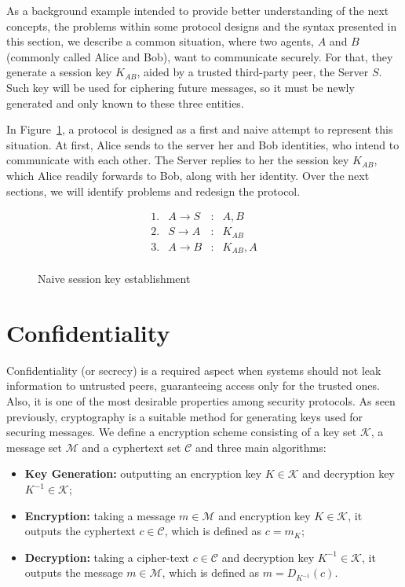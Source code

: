 As a background example intended to provide better understanding of the next concepts, the problems within some protocol designs and the syntax presented in this section, we describe a common situation, where two agents, \(A\) and \(B\) (commonly called Alice and Bob), want to communicate securely. For that, they generate a session key \(K_{AB}\), aided by a trusted third-party peer, the Server \(S\). Such key will be used for ciphering future messages, so it must be newly generated and only known to these three entities.

In Figure~\ref{prt:naive-session-key}, a protocol is designed as a first and naive attempt to represent this situation. At first, Alice sends to the server her and Bob identities, who intend to communicate with each other. The Server replies to her the session key \(K_{AB}\), which Alice readily forwards to Bob, along with her identity. Over the next sections, we will identify problems and redesign the protocol.

\begin{figure}[ht]
  \centering
  \[
    \begin{array}{rlcl}
      1. & A \longrightarrow S & : & A, B \\
      2. & S \longrightarrow A & : & K_{AB} \\
      3. & A \longrightarrow B & : & K_{AB}, A \\
    \end{array}
  \]
  \caption{Naive session key establishment}
  \label{prt:naive-session-key}
\end{figure}





\section{Confidentiality}
Confidentiality (or secrecy) is a required aspect when systems should not leak information to untrusted peers, guaranteeing access only for the trusted ones. Also, it is one of the most desirable properties among security protocols. As seen previously, cryptography is a suitable method for generating keys used for securing messages. We define a encryption scheme consisting of a key set \(\mathcal{K}\), a message set \(\mathcal{M}\) and a cyphertext set \(\mathcal{C}\) and three main algorithms:

\begin{itemize}
  \item \textbf{Key Generation:} outputting an encryption key \(K \in \mathcal{K}\) and decryption key \(K^{-1} \in \mathcal{K}\);

  \item \textbf{Encryption:} taking a message \(m \in \mathcal{M}\) and encryption key \(K \in \mathcal{K}\), it outputs the cyphertext \(c \in \mathcal{C}\), which is defined as \(c = m_K\);

  \item \textbf{Decryption:} taking a cipher-text \(c \in \mathcal{C}\) and decryption key \(K^{-1} \in \mathcal{K}\), it outputs the message \(m \in \mathcal{M}\), which is defined as \(m = D_{K^{-1}}(c)\).
\end{itemize}

